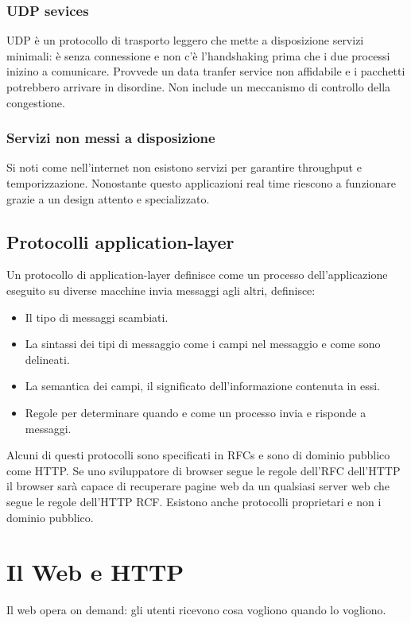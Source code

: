 \subsubsection{UDP sevices}
UDP \`e un protocollo di trasporto leggero che mette a disposizione servizi minimali: \`e senza connessione e non c'\`e l'handshaking prima che i due processi inizino a comunicare. Provvede un data tranfer 
service non affidabile e i pacchetti potrebbero arrivare in disordine. Non include un meccanismo di controllo della congestione. 
\subsubsection{Servizi non messi a disposizione}
Si noti come nell'internet non esistono servizi per garantire throughput e temporizzazione. Nonostante questo applicazioni real time riescono a funzionare grazie a un design attento e specializzato.
\subsection{Protocolli application-layer}
Un protocollo di application-layer definisce come un processo dell'applicazione eseguito su diverse macchine invia messaggi agli altri, definisce:
\begin{itemize}
\item Il tipo di messaggi scambiati.
\item La sintassi dei tipi di messaggio come i campi nel messaggio e come sono delineati.
\item La semantica dei campi, il significato dell'informazione contenuta in essi.
\item Regole per determinare quando e come un processo invia e risponde a messaggi.
\end{itemize}
Alcuni di questi protocolli sono specificati in RFCs e sono di dominio pubblico come HTTP. Se uno sviluppatore di browser segue le regole dell'RFC dell'HTTP il browser sar\`a capace di recuperare pagine web
da un qualsiasi server web che segue le regole dell'HTTP RCF. Esistono anche protocolli proprietari e non i dominio pubblico. 
\section{Il Web e HTTP}
Il web opera on demand: gli utenti ricevono cosa vogliono quando lo vogliono. 
